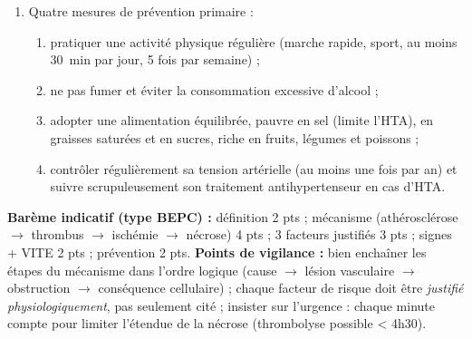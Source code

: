 \documentclass[11pt]{article}
\begin{document}
\begin{corrige}
\begin{enumerate}
\begin{itemize}
\item \textbf{I} : Incapacité (faiblesse ou paralysie brutale d'un bras, d'une jambe, d'un côté du visage) ;
\item \textbf{T} : Trouble de la parole (impossible de parler, mots incompréhensibles) ;
\item \textbf{E} : Extrême urgence : appeler immédiatement les secours (\textbf{112} ou \textbf{119}).
\end{itemize}
\item Quatre mesures de prévention primaire :
\begin{enumerate}
\item pratiquer une activité physique régulière (marche rapide, sport, au moins \SI{30}{\minute} par jour, 5 fois par semaine) ;
\item ne pas fumer et éviter la consommation excessive d'alcool ;
\item adopter une alimentation équilibrée, pauvre en sel (limite l'HTA), en graisses saturées et en sucres, riche en fruits, légumes et poissons ;
\item contrôler régulièrement sa tension artérielle (au moins une fois par an) et suivre scrupuleusement son traitement antihypertenseur en cas d'HTA.
\end{enumerate}
\end{enumerate}
\textbf{Barème indicatif (type BEPC) :} définition 2 pts ; mécanisme (athérosclérose $\to$ thrombus $\to$ ischémie $\to$ nécrose) 4 pts ; 3 facteurs justifiés 3 pts ; signes + VITE 2 pts ; prévention 2 pts.
\textbf{Points de vigilance :} bien enchaîner les étapes du mécanisme dans l'ordre logique (cause $\to$ lésion vasculaire $\to$ obstruction $\to$ conséquence cellulaire) ; chaque facteur de risque doit être \emph{justifié physiologiquement}, pas seulement cité ; insister sur l'urgence : chaque minute compte pour limiter l'étendue de la nécrose (thrombolyse possible < 4h30).
\end{corrige}
\end{document}

